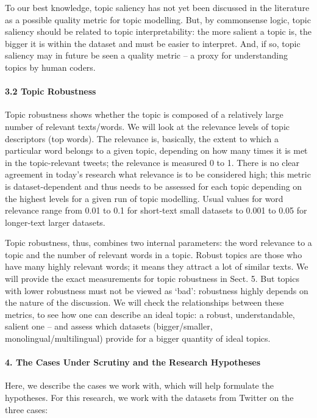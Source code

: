 To our best knowledge, topic saliency has not yet been discussed in the literature as a possible quality metric for topic modelling. But, by commonsense logic, topic saliency should be related to topic interpretability: the more salient a topic is, the bigger it is within the dataset and must be easier to interpret. And, if so, topic saliency may in future be seen a quality metric -- a proxy for understanding topics by human coders.

\paragraph{3.2 Topic Robustness}

Topic robustness shows whether the topic is composed of a relatively large number of relevant texts/words. We will look at the relevance levels of topic descriptors (top words). The relevance is, basically, the extent to which a particular word belongs to a given topic, depending on how many times it is met in the topic-relevant tweets; the relevance is measured 0 to 1. There is no clear agreement in today’s research what relevance is to be considered high; this metric is dataset-dependent and thus needs to be assessed for each topic depending on the highest levels for a given run of topic modelling. Usual values for word relevance range from 0.01 to 0.1 for short-text small datasets to 0.001 to 0.05 for longer-text larger datasets.

Topic robustness, thus, combines two internal parameters: the word relevance to a topic and the number of relevant words in a topic. Robust topics are those who have many highly relevant words; it means they attract a lot of similar texts. We will provide the exact measurements for topic robustness in Sect. 5. But topics with lower robustness must not be viewed as ‘bad’: robustness highly depends on the nature of the discussion.
We will check the relationships between these metrics, to see how one can describe an ideal topic: a robust, understandable, salient one -- and assess which datasets (bigger/smaller, monolingual/multilingual) provide for a bigger quantity of ideal topics.

\paragraph{4. The Cases Under Scrutiny and the Research Hypotheses}

Here, we describe the cases we work with, which will help formulate the hypotheses. For this research, we work with the datasets from Twitter on the three cases:

